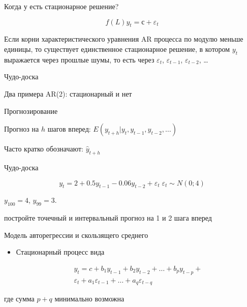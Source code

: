 \documentclass[ignorenonframetext,]{beamer}
\begin{document}
\begin{frame}{Когда у есть стационарное решение?}

\[
f(L)y_t=с+\varepsilon_t
\]

Если корни характеристического уравнения AR процесса по модулю меньше
единицы, то существует единственное стационарное решение, в котором
$y_t$ выражается через прошлые шумы, то есть через $\varepsilon_t$,
$\varepsilon_{t-1}$, $\varepsilon_{t-2}$, \ldots

\end{frame}

\begin{frame}{Чудо-доска}

Два примера AR(2): стационарный и нет

\end{frame}

\begin{frame}{Прогнозирование}

Прогноз на $h$ шагов вперед: $E(y_{t+h}|y_t, y_{t-1}, y_{t-2}, \ldots)$

Часто кратко обозначают: $\hat{y}_{t+h}$

\end{frame}

\begin{frame}{Чудо-доска}

\[
y_t=2+0.5y_{t-1}-0.06y_{t-2}+\varepsilon_t \; \varepsilon_t \sim N(0;4)
\]

$y_{100}=4$, $y_{99}=3$.

постройте точечный и интервальный прогноз на 1 и 2 шага вперед

\end{frame}

\begin{frame}{Модель авторегрессии и скользящего среднего}

\begin{itemize}
\itemsep1pt\parskip0pt
\item
  Стационарный процесс вида

  \begin{multline}
  \nonumber
  y_t=c + b_1 y_{t-1} + b_2 y_{t-2} + \ldots + b_p y_{t-p} + \\
  \varepsilon_t + a_1 \varepsilon_{t-1} + \ldots + a_q \varepsilon_{t-q}
  \end{multline}
\end{itemize}

где сумма $p+q$ минимально возможна

\end{frame}
\end{document}
